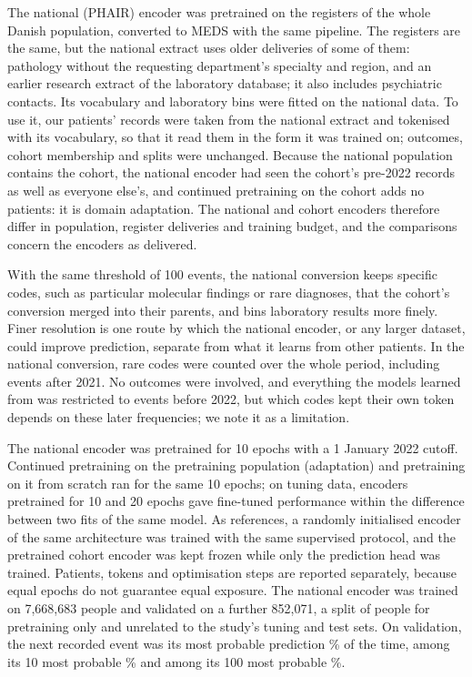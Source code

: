 The national (PHAIR) encoder was pretrained on the registers of the whole
Danish population, converted to MEDS with the same pipeline. The registers are
the same, but the national extract uses older deliveries of some of them:
pathology without the requesting department's specialty and region, and an
earlier research extract of the laboratory database; it also includes
psychiatric contacts. Its vocabulary and laboratory bins were fitted on the
national data. To use it, our patients' records were taken from the national
extract and tokenised with its vocabulary, so that it read them in the form it
was trained on; outcomes, cohort membership and splits were unchanged. Because
the national population contains the cohort, the national encoder had seen the
cohort's pre-2022 records as well as everyone else's, and continued pretraining
on the cohort adds no patients: it is domain adaptation. The national and
cohort encoders therefore differ in population, register deliveries and
training budget, and the comparisons concern the encoders as delivered.

With the same threshold of 100 events, the national conversion keeps specific
codes, such as particular molecular findings or rare diagnoses, that the
cohort's conversion merged into their parents, and bins laboratory results more
finely. Finer resolution is one route by which the national encoder, or any
larger dataset, could improve prediction, separate from what it learns from
other patients. In the national conversion, rare codes were counted over the
whole period, including events after 2021. No outcomes were involved, and
everything the models learned from was restricted to events before 2022, but
which codes kept their own token depends on these later frequencies; we note it
as a limitation.

The national encoder was pretrained for 10 epochs with a 1 January 2022
cutoff. Continued pretraining on the pretraining population (adaptation) and
pretraining on it from scratch ran for the same 10 epochs; on tuning data,
encoders pretrained for 10 and 20 epochs gave fine-tuned performance within the
difference between two fits of the same model. As references, a randomly
initialised encoder of the same architecture was trained with the same
supervised protocol, and the pretrained cohort encoder was kept frozen while
only the prediction head was trained.
Patients, tokens and optimisation steps are reported separately, because equal
epochs do not guarantee equal exposure. The national encoder was trained on
7,668,683 people and validated on a further 852,071, a split of people for
pretraining only and unrelated to the study's tuning and test sets. On
validation, the next recorded event was its most probable prediction
\% of the time, among its 10 most probable \% and
among its 100 most probable \%. 

